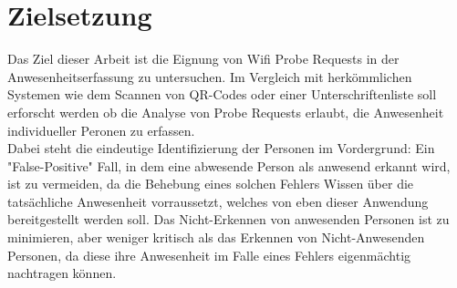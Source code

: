 \section{Zielsetzung}\label{goal}

Das Ziel dieser Arbeit ist die Eignung von Wifi Probe Requests in der Anwesenheitserfassung zu untersuchen.
Im Vergleich mit herkömmlichen Systemen wie dem Scannen von QR-Codes oder einer Unterschriftenliste soll erforscht werden ob die Analyse von Probe Requests erlaubt, die Anwesenheit individueller Peronen zu erfassen.
\\

Dabei steht die eindeutige Identifizierung der Personen im Vordergrund:
Ein "False-Positive" Fall, in dem eine abwesende Person als anwesend erkannt wird, ist zu vermeiden, da die Behebung eines solchen Fehlers Wissen über die tatsächliche Anwesenheit vorraussetzt, welches von eben dieser Anwendung bereitgestellt werden soll.
Das Nicht-Erkennen von anwesenden Personen ist zu minimieren, aber weniger kritisch als das Erkennen von Nicht-Anwesenden Personen, da diese ihre Anwesenheit im Falle eines Fehlers eigenmächtig nachtragen können.
